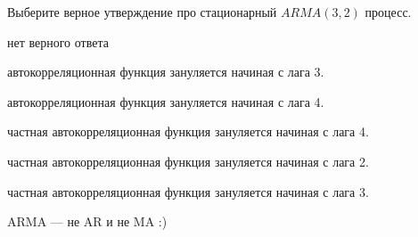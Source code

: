 
\begin{question}
Выберите верное утверждение про стационарный \(ARMA(3, 2)\) процесс.
\begin{answerlist}
  \item нет верного ответа
  \item автокорреляционная функция зануляется начиная с лага 3.
  \item автокорреляционная функция зануляется начиная с лага 4.
  \item частная автокорреляционная функция зануляется начиная с лага 4.
  \item частная автокорреляционная функция зануляется начиная с лага 2.
  \item частная автокорреляционная функция зануляется начиная с лага 3.
\end{answerlist}
\end{question}

\begin{solution}
ARMA --- не AR и не MA :)
\end{solution}

